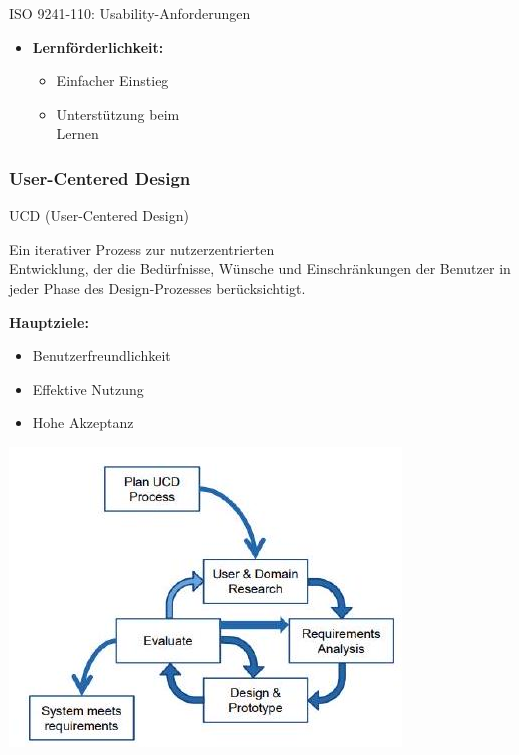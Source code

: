\begin{theorem}{ISO 9241-110: Usability-Anforderungen}
\begin{minipage}[t]{0.4\linewidth}
\begin{itemize}
    \item \textbf{Lernförderlichkeit:}
    \begin{itemize}
        \item Einfacher Einstieg
        \item Unterstützung beim \\ Lernen
    \end{itemize}
\end{itemize}
\end{minipage}
\end{theorem}



\subsubsection{User-Centered Design}

\begin{concept}{UCD (User-Centered Design)}

\begin{minipage}{0.4\linewidth}
Ein iterativer Prozess zur nutzerzentrierten \\ Entwicklung, der die Bedürfnisse, Wünsche und Einschränkungen 
der Benutzer in jeder Phase des Design-Prozesses berücksichtigt.

\textbf{Hauptziele:}
\begin{itemize}
    \item Benutzerfreundlichkeit
    \item Effektive Nutzung
    \item Hohe Akzeptanz
\end{itemize}
\end{minipage}
\begin{minipage}{0.6\linewidth}
    \vspace{-5mm}
    \includegraphics[width=\linewidth]{images/2024_12_29_0d1d7b5551ea1b4b41bdg-03}
\end{minipage}
\end{concept}

